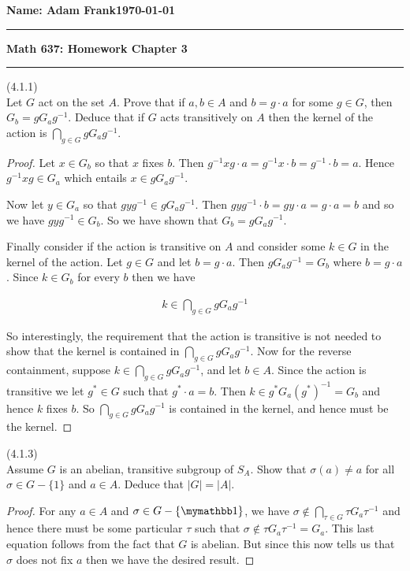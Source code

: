 \documentclass{exam}
\begin{document}
\noindent \textbf{Name: Adam Frank}\hfill \textbf{\today}

\vspace{.3cm}
\hrule
\begin{center}
{\bf \Large{Math 637: Homework Chapter 3}}
\end{center}
\hrule
\vspace{.3cm}


\begin{questions}
\question(4.1.1)\\
Let $G$ act on the set $A$.  Prove that if $a,b\in A$ and $b=g\cdot a$ for some $g\in G$, then $G_b=gG_ag^{-1}$.  Deduce that if $G$ acts transitively on $A$ then the kernel of the action is $\displaystyle\bigcap_{g\in G} gG_ag^{-1}$.

\begin{proof}
  Let $x\in G_b$ so that $x$ fixes $b$.  Then $g^{-1}xg\cdot a = g^{-1}x\cdot b = g^{-1}\cdot b=a$.  Hence $g^{-1}xg\in G_a$ which entails $x\in gG_ag^{-1}$.

  Now let $y\in G_a$ so that $gyg^{-1}\in gG_ag^{-1}$.  Then $gyg^{-1}\cdot b = gy\cdot a = g\cdot a = b$ and so we have $gyg^{-1}\in G_b$.  So we have shown that $G_b=gG_ag^{-1}$.

  Finally consider if the action is transitive on $A$ and consider some $k\in G$ in the kernel of the action.  Let $g\in G$ and let $b=g\cdot a$.  Then $gG_ag^{-1} = G_b$ where $b = g\cdot a$.  Since $k\in G_b$ for every $b$ then we have

  \begin{align*}
    k\in \bigcap_{g\in G}gG_ag^{-1}
  \end{align*}

  So interestingly, the requirement that the action is transitive is not needed to show that the kernel is contained in $\displaystyle \bigcap_{g\in G}gG_ag^{-1}$.  Now for the reverse containment, suppose $k\in \bigcap_{g\in G}gG_ag^{-1}$, and let $b\in A$.  Since the action is transitive we let $g^*\in G$ such that $g^*\cdot a = b$.  Then $k\in g^*G_a(g^*)^{-1} = G_b$ and hence $k$ fixes $b$.  So $\displaystyle \bigcap_{g\in G}gG_ag^{-1}$ is contained in the kernel, and hence must be the kernel.
\end{proof}

\question(4.1.3)\\
Assume $G$ is an abelian, transitive subgroup of $S_A$.  Show that $\sigma(a)\ne a$ for all $\sigma\in G-\{1\}$ and $a\in A$.  Deduce that $|G|=|A|$.

\begin{proof}
  For any $a\in A$ and $\sigma\in G-\{\mymathbb 1\}$, we have $\sigma\not\in \displaystyle \bigcap_{\tau\in G}\tau G_a\tau^{-1}$ and hence there must be some particular $\tau$ such that $\sigma\not\in \tau G_a\tau^{-1}=G_a$.  This last equation follows from the fact that $G$ is abelian.  But since this now tells us that $\sigma$ does not fix $a$ then we have the desired result.


\end{proof}
\end{questions}
\end{document}
